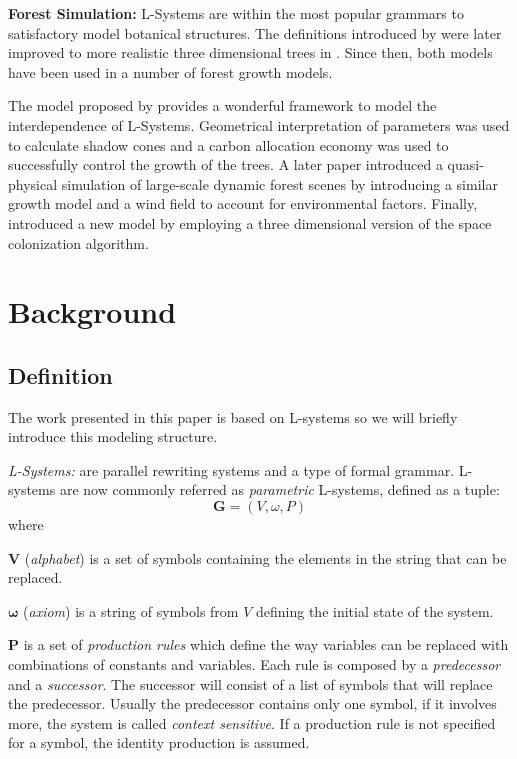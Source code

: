 \documentclass[letterpaper,twoside,11pt]{article}
\begin{document}
\begin{multicols}{2}
\textbf{Forest Simulation:} L-Systems are within the most popular grammars to satisfactory model botanical structures. The definitions introduced by \cite{Prusinkiewicz:1996:ABP:235579} were later improved to more realistic three dimensional trees in \cite{4055766}. Since then, both models have been used in a number of forest growth models.

The model proposed by \cite{KurthSloboda2002} provides a wonderful framework to model the interdependence of L-Systems. Geometrical interpretation of parameters was used to calculate shadow cones and a carbon allocation economy was used to successfully control the growth of the trees. A later paper introduced a quasi-physical simulation of large-scale dynamic forest scenes by introducing a similar growth model and a wind field to account for environmental factors. Finally, \cite{Runions07modelingtrees} introduced a new model by employing a three dimensional version of the space colonization algorithm.


\section{Background} %
\label{sec:background}

\subsection{Definition} %
\label{sub:definition}

The work presented in this paper is based on L-systems so we will briefly introduce this modeling structure.

\emph{L-Systems:} are parallel rewriting systems and a type of formal grammar. L-systems are now commonly referred as \emph{parametric} L-systems, defined as a tuple:
\begin{equation}
	\textbf{G} = (V, \omega, P)
\end{equation}
where
\begin{compactitem}
\item $\textbf{V}$ (\emph{alphabet}) is a set of symbols containing the elements in the string that can be replaced.
\item $\boldsymbol\omega$ (\emph{axiom}) is a string of symbols from $V$ defining the initial state of the system.
\item $\textbf{P}$ is a set of \emph{production rules} which define the way variables can be replaced with combinations of constants and variables. Each rule is composed by a \emph{predecessor} and a \emph{successor}. The successor will consist of a list of symbols that will replace the predecessor. Usually the predecessor contains only one symbol, if it involves more, the system is called \emph{context sensitive}. If a production rule is not specified for a symbol, the identity production is assumed.
\end{compactitem}


\end{multicols}
\end{document}
